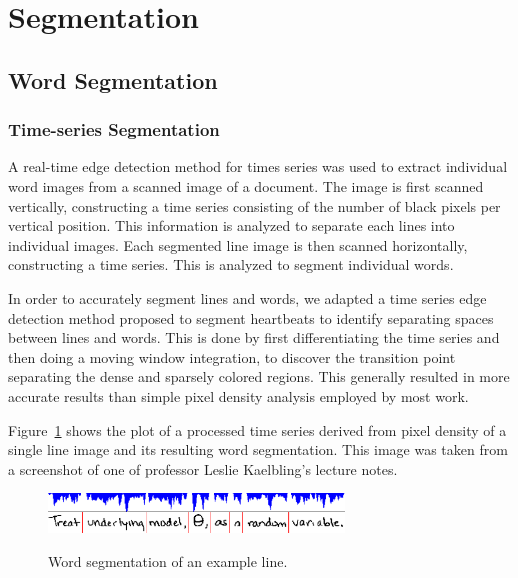 \documentclass[12pt]{article}
\begin{document}
\section{Segmentation}
\label{section:segmentation}
	\subsection{Word Segmentation}
		\subsubsection{Time-series Segmentation}
		A real-time edge detection method for times series was used to extract individual word images from a scanned image of a document. The image is first scanned vertically, constructing a time series consisting of the number of black pixels per vertical position. This information is analyzed to separate each lines into individual images. Each segmented line image is then scanned horizontally, constructing a time series. This is analyzed to segment individual words.
		
		In order to accurately segment lines and words, we adapted a time series edge detection method proposed to segment heartbeats to identify separating spaces between lines and words. This is done by first differentiating the time series and then doing a moving window integration, to discover the transition point separating the dense and sparsely colored regions. This generally resulted in more accurate results than simple pixel density analysis employed by most work.
		
		Figure~\ref{figure:word_segmentation} shows the plot of a processed time series derived from pixel density of a single line image and its resulting word segmentation. This image was taken from a screenshot of one of professor Leslie Kaelbling's lecture notes.
		
		\begin{figure}[htbp!]
		\centering
		\includegraphics[width=0.7\textwidth]{word_segmentation.eps}
		\label{figure:word_segmentation}
		\caption{Word segmentation of an example line.}
		\end{figure}
		
\end{document}
